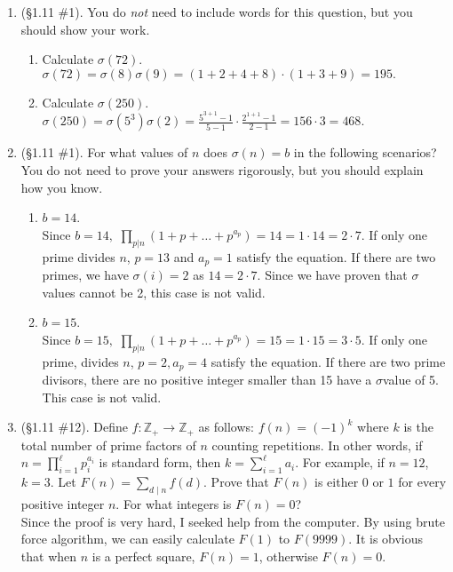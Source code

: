 \documentclass[11pt,a4paper]{article}
\newcommand{\Z}{\mathbb{Z}}
\begin{document}
\begin{enumerate}
	\item (\S 1.11 \#1). You do \textit{not} need to include words for this question, but you should show your work.
	\begin{enumerate}
		\item  Calculate \(\sigma(72)\).\\
			\(\sigma(72) = \sigma(8)\sigma(9) = (1+2+4+8)\cdot (1+3+9) = 195.\)
		\item  Calculate \(\sigma(250)\).\\
			\(\sigma(250) = \sigma(5^3)\sigma(2) = \frac{5^{3+1}-1}{5-1} \cdot \frac{2^{1+1}-1}{2-1} = 156 \cdot 3 = 468.\)
	\end{enumerate}

	\item (\S 1.11 \#1). For what values of \(n\) does \(\sigma(n) = b\) in the following scenarios? You do not need to prove your answers rigorously, but you should explain how you know.
	\begin{enumerate}
		\item  \(b = 14\).\\
			Since $b=14,$ $\prod_{p|n} (1+p+\ldots +p^{a_p}) = 14= 1 \cdot 14 = 2 \cdot 7.$ If only one prime divides $n$, $p=13$ and $a_p=1$ satisfy the equation. If there are two primes, we have $\sigma (i) = 2 $ as $14 = 2 \cdot 7.$ Since we have proven that $\sigma$ values cannot be 2, this case is not valid.
		\item  \(b = 15\).\\
			Since $b=15,$ $\prod_{p|n} (1+p+\ldots +p^{a_p}) = 15 = 1 \cdot 15 = 3 \cdot 5.$ If only one prime, divides $n$, $p=2, a_p=4$ satisfy the equation. If there are two prime divisors, there are no positive integer smaller than 15 have a $\sigma$value of 5. This case is not valid.
	\end{enumerate}

	\item (\S 1.11 \#12). Define \(f : \Z_{+} \to \Z_{+}\) as follows: \(f(n)= \left(-1\right)^{k}\) where \(k\) is the total number of prime factors of \(n\) counting repetitions. In other words, if \(\displaystyle n = \prod_{i=1}^{\ell} p_{i}^{a_{i}}\) is standard form, then \(\displaystyle k = \sum_{i=1}^{\ell} a_{i}\). For example, if \(n = 12\), \(k=3\). Let \(\displaystyle F(n) = \sum_{d \mid n} f(d)\). Prove that \(F(n)\) is either \(0\) or \(1\) for every positive integer \(n\). For what integers is \(F(n) = 0\)?\\

	Since the proof is very hard, I seeked help from the computer. By using brute force algorithm, we can easily calculate $F(1)$ to $F(9999)$. It is obvious that when $n$ is a perfect square, $F(n)=1$, otherwise $F(n)=0$.


\end{enumerate}
\end{document}
